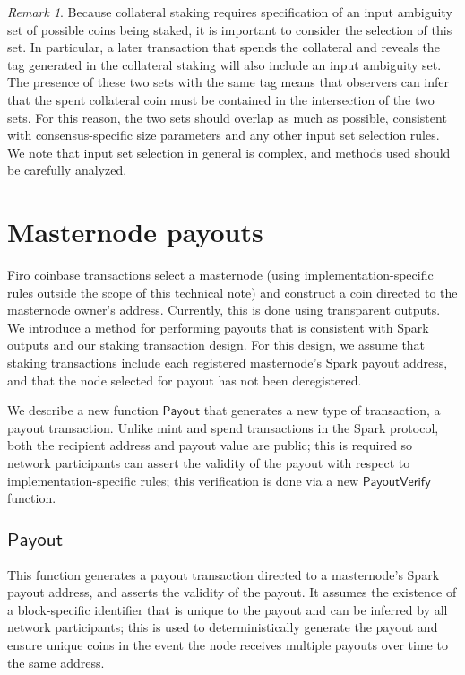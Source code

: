 \documentclass{article}
\newcommand{\func}[1]{\mathsf{#1}}
\theoremstyle{remark}
\newtheorem*{remark}{Remark}
\begin{document}
\begin{remark}
Because collateral staking requires specification of an input ambiguity set of possible coins being staked, it is important to consider the selection of this set.
In particular, a later transaction that spends the collateral and reveals the tag generated in the collateral staking will also include an input ambiguity set.
The presence of these two sets with the same tag means that observers can infer that the spent collateral coin must be contained in the intersection of the two sets.
For this reason, the two sets should overlap as much as possible, consistent with consensus-specific size parameters and any other input set selection rules.
We note that input set selection in general is complex, and methods used should be carefully analyzed.
\end{remark}


\section{Masternode payouts}

Firo coinbase transactions select a masternode (using implementation-specific rules outside the scope of this technical note) and construct a coin directed to the masternode owner's address.
Currently, this is done using transparent outputs.
We introduce a method for performing payouts that is consistent with Spark outputs and our staking transaction design.
For this design, we assume that staking transactions include each registered masternode's Spark payout address, and that the node selected for payout has not been deregistered.

We describe a new function $\func{Payout}$ that generates a new type of transaction, a payout transaction.
Unlike mint and spend transactions in the Spark protocol, both the recipient address and payout value are public; this is required so network participants can assert the validity of the payout with respect to implementation-specific rules; this verification is done via a new $\func{PayoutVerify}$ function.


\subsection{\texorpdfstring{$\func{Payout}$}{Payout}}

This function generates a payout transaction directed to a masternode's Spark payout address, and asserts the validity of the payout.
It assumes the existence of a block-specific identifier that is unique to the payout and can be inferred by all network participants; this is used to deterministically generate the payout and ensure unique coins in the event the node receives multiple payouts over time to the same address.
\end{document}
